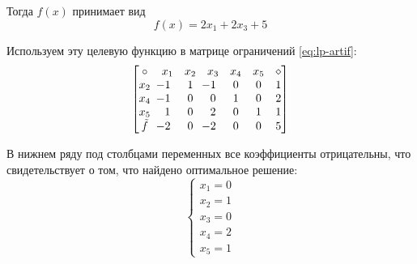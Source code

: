 Тогда $f(x)$ принимает вид
\begin{equation*}
  f(x) = 2x_1+2x_3+5
\end{equation*}

Используем эту целевую функцию в матрице ограничений \eqref{eq:lp-artif}:
\begin{equation*}
  \begin{bmatrix}
    \circ & x_1 & x_2 & x_3 & x_4 & x_5 & \diamond\\
    x_2 &\mm{1}& 1 &\mm{1}& 0 & 0 & 1\\
    x_4 &\mm{1}& 0 &  0 & 1 & 0 & 2\\
    x_5 &  1 & 0 &  2 & 0 & 1 & 1\\
    \tilde{f} & \mm{2} & 0 & \mm{2} & 0 & 0 & 5
  \end{bmatrix}
\end{equation*}

В нижнем ряду под столбцами переменных все коэффициенты отрицательны,
что свидетельствует о том, что найдено оптимальное решение:
\begin{equation}
  \begin{cases}
    x_1 = 0\\
    x_2 = 1\\
    x_3 = 0\\
    x_4 = 2\\
    x_5 = 1
  \end{cases}
\end{equation}


